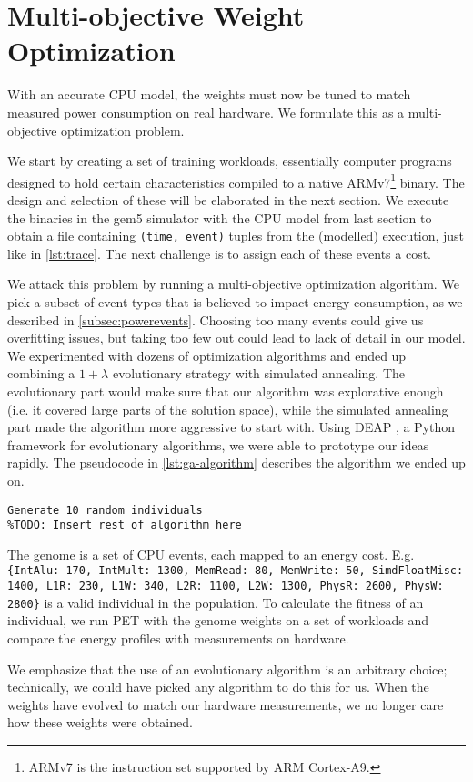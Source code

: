 \section{Multi-objective Weight Optimization}

With an accurate CPU model, the weights must now be tuned to match measured
power consumption on real hardware. We formulate this as a multi-objective
optimization problem.

We start by creating a set of training workloads, essentially computer programs
designed to hold certain characteristics compiled to a native
ARMv7\footnote{ARMv7 is the instruction set supported by ARM Cortex-A9.} binary.
The design and selection of these will be elaborated in the next section. We
execute the binaries in the gem5 simulator with the CPU model from last
section to obtain a file containing \texttt{(time, event)} tuples from the
(modelled) execution, just like in \autoref{lst:trace}. The next challenge is to
assign each of these events a cost.

We attack this problem by running a multi-objective optimization algorithm. We
pick a subset of event types that is believed to impact energy consumption, as
we described in \autoref{subsec:powerevents}. Choosing too many events could
give us overfitting issues, but taking too few out could lead to lack of detail
in our model. We experimented with dozens of optimization algorithms and ended
up combining a $1 + \lambda$ evolutionary strategy with simulated annealing. The
evolutionary part would make sure that our algorithm was explorative enough
(i.e. it covered large parts of the solution space), while the simulated
annealing part made the algorithm more aggressive to start with.  Using DEAP
\cite{DEAP_JMLR2012}, a Python framework for evolutionary algorithms, we were
able to prototype our ideas rapidly. The pseudocode in
\autoref{lst:ga-algorithm} describes the algorithm we ended up on.

\begin{lstlisting}[caption={Algorithm used to evolve a set of event weights},label={lst:ga-algorithm}]
Generate 10 random individuals
%TODO: Insert rest of algorithm here
\end{lstlisting}

\begin{figure}
    \centering
    \def\svgwidth{\columnwidth}
    
\end{figure}

The genome is a set of CPU events, each mapped to an energy cost. E.g.
\texttt{\{IntAlu: 170, IntMult: 1300, MemRead: 80, MemWrite: 50, SimdFloatMisc:
1400, L1R: 230, L1W: 340, L2R: 1100, L2W: 1300, PhysR: 2600, PhysW: 2800\}} is a
valid individual in the population. To calculate the fitness of an individual,
we run PET with the genome weights on a set of workloads and compare the energy
profiles with measurements on hardware.

We emphasize that the use of an evolutionary algorithm is an arbitrary choice;
technically, we could have picked any algorithm to do this for us. When the
weights have evolved to match our hardware measurements, we no longer care how
these weights were obtained.
